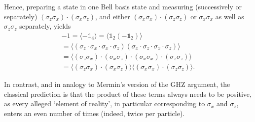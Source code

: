 \documentclass[
  twocolumn,
 showpacs,
 showkeys,
 preprintnumbers,
 amsmath,amssymb,
 aps,
 pra,
  longbibliography,
 floatfix,
 ]{revtex4-2}
\newcommand\myotimes{ }
\begin{document}
Hence, preparing a state in one Bell basis state and measuring (successively or separately)
$
(\sigma_z \myotimes \sigma_x) \cdot (\sigma_x \myotimes \sigma_z)
$,
and either
$
(\sigma_x \myotimes \sigma_x) \cdot (\sigma_z \myotimes \sigma_z)
$
or
$
\sigma_x \myotimes \sigma_x
$
as well as
$
\sigma_z \myotimes \sigma_z
$ separately,
yields
\begin{equation}
\begin{split}  -1 =
\langle
-\mathbb{1}_4
 \rangle
=
\langle
\mathbb{1}_2 \myotimes (-\mathbb{1}_2)
 \rangle
\\
=
 \langle
(\sigma_z  \cdot \sigma_x \cdot \sigma_x \cdot \sigma_z ) \myotimes (\sigma_x \cdot \sigma_z \cdot  \sigma_x \cdot \sigma_z)
 \rangle
\\
=
\langle
(\sigma_z \myotimes \sigma_x) \cdot (\sigma_x \myotimes \sigma_z)   \cdot
(\sigma_x \myotimes \sigma_x) \cdot (\sigma_z \myotimes \sigma_z)
\rangle
\\
=
\langle
(\sigma_z \myotimes \sigma_x) \cdot (\sigma_x \myotimes \sigma_z)\rangle
\langle  (\sigma_x \myotimes \sigma_x) \cdot (\sigma_z \myotimes \sigma_z) \rangle
.
\end{split}
\end{equation}

In contrast, and in analogy to Mermin's version of the GHZ argument, the classical prediction is that the product of these terms always needs to be positive, as every alleged `element of reality', in particular corresponding to $\sigma_x$ and $\sigma_z$, enters an even number of times (indeed, twice per particle).
\end{document}
